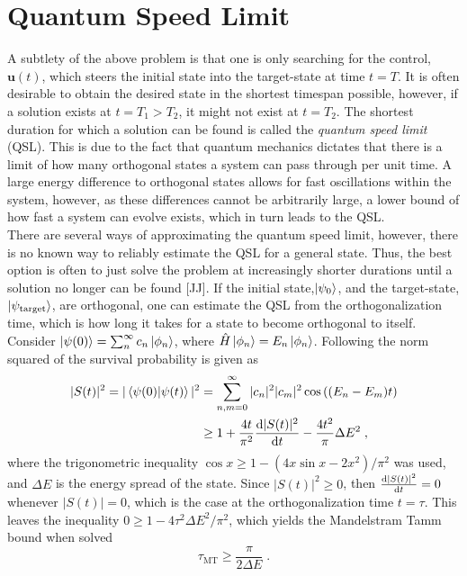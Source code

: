 \section{Quantum Speed Limit}
A subtlety of the above problem is that one is only searching for the control, $\boldsymbol{u}(t)$, which steers the initial state into the target-state at time $t = T$. It is often desirable to obtain the desired state in the shortest timespan possible, however, if a solution exists at $t= T_1 > T_2$, it might not exist at $t = T_2$. The shortest duration for which a solution can be found is called the \textit{quantum speed limit} (QSL). This is due to the fact that quantum mechanics dictates that there is a limit of how many orthogonal states a system can pass through per unit time. A large energy difference to orthogonal states allows for fast oscillations within the system, however, as these differences cannot be arbitrarily large, a lower bound of how fast a system can evolve exists, which in turn leads to the QSL.\\
There are several ways of approximating the quantum speed limit, however, there is no known way to reliably estimate the QSL for a general state. Thus, the best option is often to just solve the problem at increasingly shorter durations until a solution no longer can be found [JJ]. 
If the initial state,$\ket{\psi_0}$, and the target-state, $\ket{\psi_{\mathrm{target}}}$, are orthogonal, one can estimate the QSL from the orthogonalization time, which is how long it takes for a state to become orthogonal to itself.
Consider $\ket{\psi (0)} = \sum_{n}^{\infty} c_n \ket{\phi _n}$, where $\hat{H} \ket{\phi _n} = E_n \ket{\phi _n}$. Following \cite{QSLtoffoli} the norm squared of the survival probability is given as
\begin{align}
	|S(t)|^2 = |\braket{\psi (0) | \psi (t)}|^2 &= \sum_{n , m = 0}^{\infty} |c_n|^2 |c_m|^2 \cos \left( (E_n - E_m) t \right) \nonumber \\
	&\geq 1 + \frac{4 t}{\pi ^2} \dv{|S(t)|^2}{t} - \frac{4 t^2}{\pi} \Delta E^2 \; ,
\end{align}
where the trigonometric inequality $\cos x \geq 1 - \left( 4 x \sin x - 2 x^2 \right) / \pi^2$ was used, and $\Delta E$ is the energy spread of the state.
Since $|S(t)|^2 \geq 0$, then $\dv{|S(t)|^2}{t} = 0$ whenever $|S(t)| = 0$, which is the case at the orthogonalization time $t = \tau$. This leaves the inequality $0 \geq 1 - 4 \tau^2 \Delta E^2 / \pi^2$, which yields the Mandelstram Tamm bound when solved
\begin{equation}
	\tau_{\mathrm{MT}} \geq \frac{\pi}{2 \Delta E} \; .
\end{equation}
